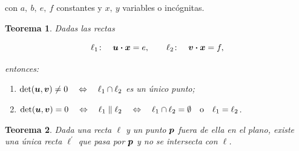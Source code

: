 \documentclass{article}
\theoremstyle{definicion}
\theoremstyle{definition}             %
\theoremstyle{definition}             %
\theoremstyle{definition}
\theoremstyle{definition}
\theoremstyle{observacion}
\theoremstyle{definition}
\theoremstyle{plain}
\newtheorem{theorem}{Teorema}
\theoremstyle{definition}
\theoremstyle{afirmacion}
\theoremstyle{notation}
\theoremstyle{definition}
\begin{document}
        con \(a,\ b,\ e,\ f\) constantes y \(x,\ y\) variables o incógnitas.

        \begin{theorem}
            Dadas las rectas

            \begin{equation*}
                \ell_{1} \colon\quad \vb*{u} \vdot \vb*{x} = e,\qquad \ell_{2} \colon\quad \vb*{v} \vdot \vb*{x} = f,
            \end{equation*}

            entonces:

            \begin{enumerate}[label = \textnormal{\Roman*)}]
                \item \(\det(\vb*{u}, \vb*{v}) \neq 0\quad \Leftrightarrow\quad \ell_{1} \cap \ell_{2}\) es un único punto;
                \item \(\det(\vb*{u}, \vb*{v}) = 0\quad \Leftrightarrow\quad \ell_{1} \parallel \ell_{2}\quad \Leftrightarrow\quad \ell_{1} \cap \ell_{2} = \emptyset\quad \text{o}\quad \ell_{1} = \ell_{2}\).
            \end{enumerate}
        \end{theorem}
        
        \begin{theorem}
            Dada una recta \(\ell\) y un punto \(\vb*{p}\) fuera de ella en el plano, existe una única recta \(\ell^{\prime}\) que pasa por \(\vb*{p}\) y no se intersecta con \(\ell\).
        \end{theorem}
\end{document}
